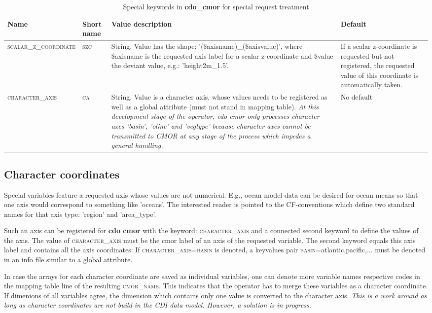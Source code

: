 \begin{table}[H]
\caption{Special keywords in \textbf{cdo\_cmor} for special request treatment}
\label{table:SpecialKeys}
\begin{tabular}[H]{|l|p{1cm}|p{6cm} | p{4cm} | }
\hline 
\textbf{Name} & \textbf{Short name} & \textbf{Value description} & \textbf{Default} \\ 
\hline 
\textsc{scalar\_z\_coordinate} & \textsc{szc} & String. Value has the shape: '(\$axisname)\_(\$axisvalue)', where \$axisname is the requested axis label for a scalar z-coordinate and \$value the deviant value, e.g.: 'height2m\_1.5'. & If a scalar z-coordinate is requested but not registered, the requested value of this coordinate is automatically taken. \\
\hline
\textsc{character\_axis} & \textsc{ca} & String. Value is a character axis, whose values needs to be registered as well as a global attribute (must not stand in mapping table). \textit{At this development stage of the operator, cdo cmor only processes character axes 'basin', 'oline' and 'vegtype' because character axes cannot be transmitted to CMOR at any stage of the process which impedes a general handling.} & No default \\
\hline 
\end{tabular} 
\end{table}

\subsection{Character coordinates}

Special variables feature a requested axis whose values are not numerical. E.g., ocean model data can be desired for ocean means so that one axis would correspond to something like 'oceans'. The interested reader is pointed to the CF-conventions which define two standard names for that axis type: 'region' and 'area\_type'. 

Such an axis can be registered for \textbf{cdo cmor} with the keyword: \textsc{character\_axis} and a connected second keyword to define the values of the axis. The value of \textsc{character\_axis} must be the cmor label of an axis of the requested variable. The second keyword equals this axis label and contains all the axis coordinates: If \textsc{character\_axis=basin} is denoted, a keyvalues pair \textsc{basin}=atlantic,pacific,... must be denoted in an info file similar to a global attribute.

In case the arrays for each character coordinate are saved as individual variables, one can denote more variable names respective codes in the mapping table line of the resulting \textsc{cmor\_name}. This indicates that the operator has to merge these variables as a character coordinate. If dimenions of all variables agree, the dimension which contains only one value is converted to the character axis.
\textit{This is a work around as long as character coordinates are not build in the CDI data model. However, a solution is in progress.}

